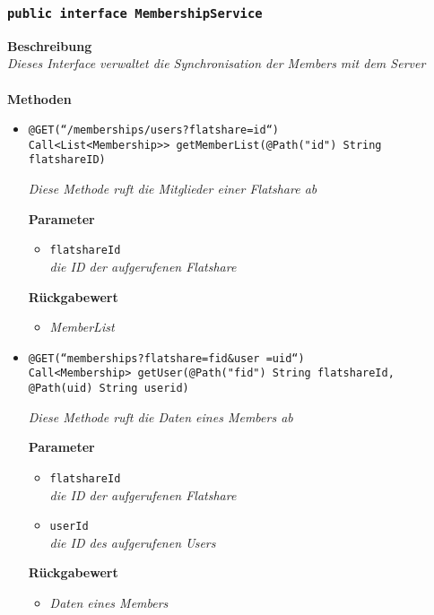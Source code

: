 	\subsubsection{\texttt{public interface MembershipService }}
	\textbf{Beschreibung}\\
	\textit{Dieses Interface verwaltet die Synchronisation der Members mit dem Server}\\
\\
	\textbf{Methoden} 
		\begin{itemize}
		\item\texttt{{@GET(``/memberships/users?flatshare={id}``) \\ Call<List<Membership>> getMemberList(@Path("id") String flatshareID)}}

		\textit{Diese Methode ruft die Mitglieder einer Flatshare ab}

		\textbf{Parameter} 
			\begin{itemize}
				\item\texttt{flatshareId}\\
		 		\textit{die ID der aufgerufenen Flatshare}
	 		\end{itemize}

		\textbf{Rückgabewert} 
		\begin{itemize}
		\item\textit{MemberList}
		\end{itemize}


      \item\texttt{{@GET(``memberships?flatshare={fid}\&user ={uid}``)\\Call<Membership> getUser(@Path("fid") String flatshareId, @Path(\grqq uid\grqq) String userid)}}

		\textit{Diese Methode ruft die Daten eines Members ab}        	

		\textbf{Parameter} 
			\begin{itemize}
				\item\texttt{flatshareId}\\
		 		\textit{die ID der aufgerufenen Flatshare}
		 		\item\texttt{userId}\\
		 		\textit{die ID des aufgerufenen Users}
	 		\end{itemize}

		\textbf{Rückgabewert} 
		\begin{itemize}
		\item\textit{Daten eines Members}
		\end{itemize}



\end{itemize}
